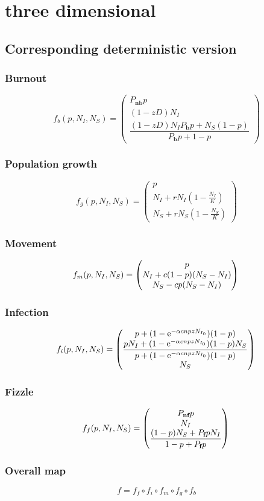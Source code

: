 \documentclass[12pt]{article}
\begin{document}
\section{three dimensional}


\subsection{Corresponding deterministic version}
\subsubsection{Burnout}
$$
    f_b(p,N_I,N_S) =
    \begin{pmatrix}
        P_\textbf{nb}p \\
        (1-zD)N_I\\
        \dfrac{(1-zD)N_IP_\textbf{b}p+N_S(1-p)}{P_\textbf{b}p+1-p}
    \end{pmatrix}
$$
\subsubsection{Population growth}
$$
    f_g(p,N_I,N_S) =
    \begin{pmatrix}
        p \\
        N_I + rN_I\left(1 - \frac{N_I}{K} \right) \\
        N_S + rN_S\left(1 - \frac{N_S}{K} \right)
    \end{pmatrix}
$$
\subsubsection{Movement}
$$
    f_m(p,N_I,N_S) =
    \begin{pmatrix}
        p \\
         N_I + c(1 - p)(N_S - N_I)\\
        N_S - cp(N_S - N_I) 
    \end{pmatrix} \\
$$
\subsubsection{Infection}
$$
    f_i(p,N_I,N_S) = 
    \begin{pmatrix}
        p + (1-\mathrm{e}^{-\alpha cnpzN_{I_0}})(1 - p) \\
        \dfrac{pN_I + (1-\mathrm{e}^{-\alpha cnpzN_{I_0}})(1 - p)N_S}{p+(1-\mathrm{e}^{-\alpha cnpzN_{I_0}})(1-p)}\\
        N_S 
    \end{pmatrix} \\
$$
\subsubsection{Fizzle}
$$
    f_f(p,N_I,N_S) =
    \begin{pmatrix}
        P_\textbf{nf}p \\
        N_I \\
        \dfrac{(1 - p)N_S + P_\textbf{f}pN_I}{1 -p+ P_\textbf{f}p}
    \end{pmatrix} \\
$$
\subsubsection{Overall map}
$$f=f_f\circ f_i  \circ f_m \circ f_g \circ f_b$$
\end{document}
